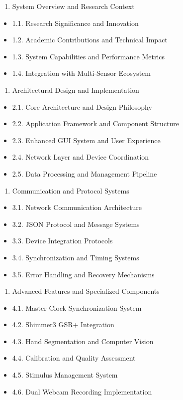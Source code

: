 \documentclass[12pt,a4paper]{article}
\begin{document}
\begin{enumerate}
\item System Overview and Research Context
\end{enumerate}
\begin{itemize}
\item 1.1. Research Significance and Innovation
\item 1.2. Academic Contributions and Technical Impact
\item 1.3. System Capabilities and Performance Metrics
\item 1.4. Integration with Multi-Sensor Ecosystem

\end{itemize}
\begin{enumerate}
\item Architectural Design and Implementation
\end{enumerate}
\begin{itemize}
\item 2.1. Core Architecture and Design Philosophy
\item 2.2. Application Framework and Component Structure
\item 2.3. Enhanced GUI System and User Experience
\item 2.4. Network Layer and Device Coordination
\item 2.5. Data Processing and Management Pipeline

\end{itemize}
\begin{enumerate}
\item Communication and Protocol Systems
\end{enumerate}
\begin{itemize}
\item 3.1. Network Communication Architecture
\item 3.2. JSON Protocol and Message Systems
\item 3.3. Device Integration Protocols
\item 3.4. Synchronization and Timing Systems
\item 3.5. Error Handling and Recovery Mechanisms

\end{itemize}
\begin{enumerate}
\item Advanced Features and Specialized Components
\end{enumerate}
\begin{itemize}
\item 4.1. Master Clock Synchronization System
\item 4.2. Shimmer3 GSR+ Integration
\item 4.3. Hand Segmentation and Computer Vision
\item 4.4. Calibration and Quality Assessment
\item 4.5. Stimulus Management System
\item 4.6. Dual Webcam Recording Implementation

\end{itemize}
\end{document}
